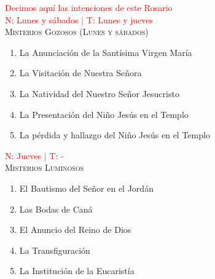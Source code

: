 \documentclass[9pt]{article}
\date{Valladolid (España), \monthyeardate\today}
\begin{document}
\begin{multicols*}{2}

    
    \vspace{1mm}
    \\[2mm]
    \\[1mm]
    \\[1mm]
    \\[1mm]
    \\
    
    \textcolor{red}{Decimos aquí las intenciones de este Rosario}\\

    \small{\textcolor{red}{N: Lunes y sábados | T: Lunes y jueves}}\\
    \textsc{Misterios Gozosos (Lunes y sábados)}
    \begin{enumerate}
        \item La Anunciación de la Santísima Virgen María
        \item La Visitación de Nuestra Señora
        \item La Natividad del Nuestro Señor Jesucristo
        \item La Presentación del Niño Jesús en el Templo
        \item La pérdida y hallazgo del Niño Jesús en el Templo
    \end{enumerate}

    \vspace{2mm}

    \small{\textcolor{red}{N: Jueves | T: -}}\\
    \textsc{Misterios Luminosos}
    \begin{enumerate}
        \item El Bautismo del Señor en el Jordán
        \item Las Bodas de Caná
        \item El Anuncio del Reino de Dios
        \item La Transfiguración
        \item La Institución de la Eucaristía
    \end{enumerate}

    \vspace{2mm}


\end{multicols*}
\end{document}
